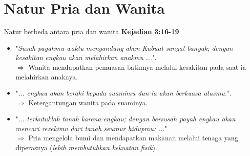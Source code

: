 \documentclass[10pt,svgnames]{beamer} %
\begin{document}
\section{Natur Pria dan Wanita}
\begin{frame}{Natur berbeda antara pria dan wanita}
	    \textbf{Kejadian 3:16-19}
	    \begin{itemize}
	    	\item<2-> "\textit{Susah payahmu waktu mengandung akan Kubuat sangat banyak; dengan kesakitan engkau akan melahirkan anakmu ...}". \\
	    	\onslide<3-> $\Longrightarrow$ Wanita mendapatkan pemuasan batinnya melalui kesakitan pada saat ia melahirkan anaknya.
	    	\item<4-> "\textit{... engkau akan berahi kepada suamimu dan ia akan berkuasa atasmu.}". \\
	    	\onslide<5-> $\Longrightarrow$ Ketergantungan wanita pada suaminya. \\
	    	\item<6-> "\textit{... terkutuklah tanah karena engkau; dengan bersusah payah engkau akan mencari rezekimu dari tanah seumur hidupmu: ...}" \\
	    	\onslide<7-> $\Longrightarrow$ Pria mengelola bumi dan mendapatkan makanan melalui tenaga yang diperasnya (\textit{lebih membutuhkan kekuatan fisik}).
	    \end{itemize}
\end{frame}
\end{document}
